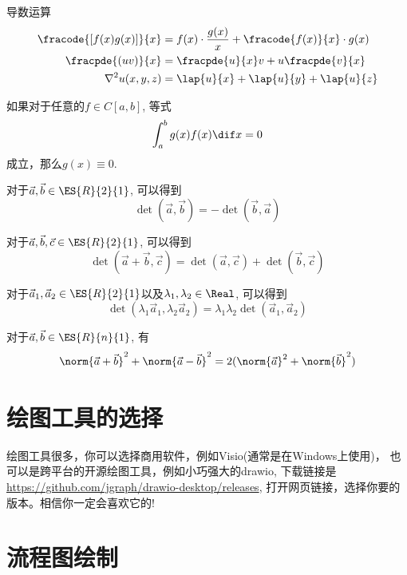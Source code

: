 \begin{example} 导数运算
\begin{align}
\fracode{[f(x)g(x)]}{x} 
&= f(x)\cdot \frac{g(x)}{x} + \fracode{f(x)}{x}\cdot g(x) \\
\fracpde{(uv)}{x}& = \fracpde{u}{x}v + u\fracpde{v}{x}\\
\nabla^2u(x,y,z)& = \lap{u}{x} + \lap{u}{y} +\lap{u}{z}
\end{align}
\end{example}

\begin{lemma} 如果对于任意的$f\in C[a,b]$, 等式
$$
\int^b_a g(x) f(x)\dif x = 0
$$
成立，那么$g(x)\equiv 0$.
\end{lemma}

\begin{property}[反对称性]
对于$\vec{a},\vec{b}\in \ES{R}{2}{1}$, 可以得到
$$
\det(\vec{a},\vec{b}) = - \det(\vec{b},\vec{a})
$$
\end{property}

\begin{property}[可加性]
对于$\vec{a},\vec{b},\vec{c}\in \ES{R}{2}{1}$, 可以得到
$$
\det(\vec{a}+\vec{b},\vec{c}) = \det(\vec{a},\vec{c}) +\det(\vec{b},\vec{c})
$$
\end{property}

\begin{property}[多重线性]
对于$\vec{a}_1,\vec{a}_2\in \ES{R}{2}{1}$以及$\lambda_1, \lambda_2\in\Real$, 可以得到
$$
\det(\lambda_1\vec{a}_1,\lambda_2\vec{a}_2) = \lambda_1\lambda_2 \det(\vec{a}_1,\vec{a}_2)
$$
\end{property}


\begin{corollary}
对于$\vec{a},\vec{b}\in \ES{R}{n}{1}$, 有
$$
\norm{\vec{a}+\vec{b}}^2 + \norm{\vec{a}-\vec{b}}^2 =2(\norm{\vec{a}}^2 +\norm{\vec{b}}^2)
$$
\end{corollary}


\section{绘图工具的选择}

绘图工具很多，你可以选择商用软件，例如Visio(通常是在Windows上使用)， 也可以是跨平台的开源绘图工具，例如小巧强大的drawio, 下载链接是\url{https://github.com/jgraph/drawio-desktop/releases}, 打开网页链接，选择你要的版本。相信你一定会喜欢它的!


\section{流程图绘制}
